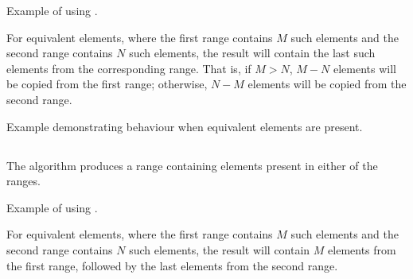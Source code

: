 
\begin{codebox}[]{\href{https://compiler-explorer.com/z/PrTn6voGn}{\ExternalLink}}
    \footnotesize Example of using .
    \tcblower
\end{codebox}

For equivalent elements, where the first range contains $M$ such elements and the second range contains $N$ such elements, the result will contain the last  such elements from the corresponding range. That is, if $M>N$, $M-N$ elements will be copied from the first range; otherwise, $N-M$ elements will be copied from the second range.

\begin{codebox}[]{\href{https://compiler-explorer.com/z/7hGacnfWe}{\ExternalLink}}
\footnotesize Example demonstrating  behaviour when equivalent elements are present.
\tcblower
{}
\end{codebox}

\subsection{\texorpdfstring{}{\texttt{std::set\_union}}}

The  algorithm produces a range containing elements present in either of the ranges.


\begin{codebox}[]{\href{https://compiler-explorer.com/z/anvj66jfT}{\ExternalLink}}
    \footnotesize Example of using .
    \tcblower
\end{codebox}

For equivalent elements, where the first range contains $M$ such elements and the second range contains $N$ such elements, the result will contain $M$ elements from the first range, followed by the last  elements from the second range.

